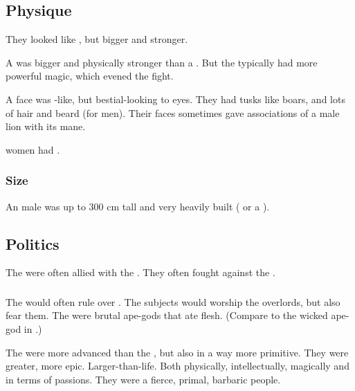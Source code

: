 \subsection{Physique}
They looked like \nephilim, but bigger and stronger. 

A \aryoth{} was bigger and physically stronger than a \quiljaar. 
But the \quiljaaran{} typically had more powerful magic, which evened the fight. 

A \aryoth{} face was \human-like, but bestial-looking to \human{} eyes. 
They had tusks like boars, and lots of hair and beard (for men). 
Their faces sometimes gave associations of a male lion with its mane. 

\Aryoth{} women had . 





\subsubsection{Size}
An \aryoth male was up to 300 cm tall and very heavily built ( or a \human). 











\subsection{Politics}
The \aryothim{} were often allied with the \vorcanths. 
They often fought against the \quiljaaran. 





\subsubsection{\Nephilim}
The \aryothim would often rule over \nephilim.
The \nephil subjects would worship the \aryoth overlords, but also fear them. 
The \aryothim were brutal ape-gods that ate \nephil flesh.
(Compare to the wicked ape-god in \cite{RobertEHoward:TheIsleoftheEons}.)

The \aryothim were more advanced than the \nephilim, but also in a way more primitive.
They were greater, more epic. 
Larger-than-life.
Both physically, intellectually, magically and in terms of passions. 
They were a fierce, primal, barbaric people.





